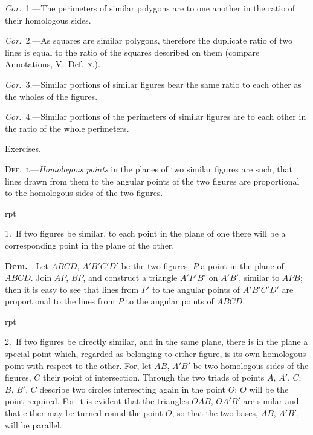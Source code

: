 \documentclass[oneside]{book}
\newcounter{wrapwidth}
\newcommand\exhead[1]{
\Needspace*{5\baselineskip}\begin{center}
\textsf{#1}
\end{center}
}
\newcommand\imgflow[3]{
\setcounter{wrapwidth}{#1}

\begin{wrapfigure}[#2]{r}{\value{wrapwidth}pt}
\begin{center}
\vspace{-0.3in}

\end{center}
\end{wrapfigure}
}
\begin{document}
\emph{Cor.}~1.---The perimeters of similar polygons are to
one another in the ratio of their homologous sides.

\emph{Cor.}~2.---As squares are similar polygons, therefore
the duplicate ratio of two lines is equal to the ratio of
the squares described on them (compare Annotations,
V.~Def.~\textsc{x.}).

\emph{Cor.}~3.---Similar portions of similar figures bear the
same ratio to each other as the wholes of the figures.

\emph{Cor.}~4.---Similar portions of the perimeters of similar
figures are to each other in the ratio of the whole perimeters.



\exhead{Exercises.}

\textsc{Def.~i.}---\emph{Homologous points} in the planes of two
similar figures are such, that lines drawn from them
to the angular points of the two figures are proportional
to the homologous sides of the two figures.

\smallskip

\imgflow{190}{11}{f199}

\begin{footnotesize}
1.~If two figures be similar, to each point in the plane of one
there will be a corresponding
point in the
plane of the other.

\textbf{Dem.}---Let $ABCD$,
$A'B'C'D'$ be the two
figures, $P$ a point in
the plane of $ABCD$.
Join $AP$, $BP$, and construct
a triangle $A'P'B'$
on $A'B'$, similar to
$APB$; then it is easy to see that lines from $P'$ to the angular
points of $A'B'C'D'$ are proportional to the lines from $P$ to the
angular points of $ABCD$.


\imgflow{170}{12}{f200}

2.~If two figures be directly similar, and in the same plane,
there is in the plane a special point which, regarded as belonging
to either figure, is its own
homologous point with respect
to the other. For,
let $AB$, $A'B'$ be two homologous
sides of the figures,
$C$ their point of intersection.
Through the two triads of
points $A$, $A'$, $C$; $B$, $B'$, $C$
describe two circles intersecting
again in the point
$O$: $O$ will be the point required.
For it is evident
that the triangles $OAB$, $OA'B'$ are similar and that either may
be turned round the point $O$, so that the two bases, $AB$, $A'B'$,
will be parallel.
\par\end{footnotesize}
\end{document}

